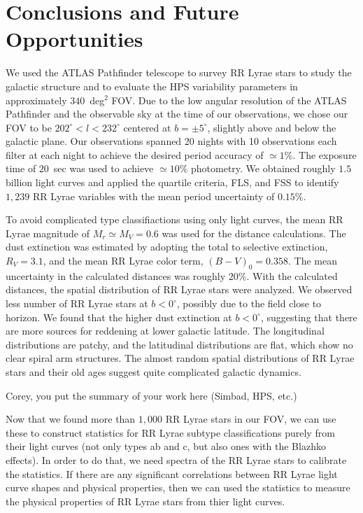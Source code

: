 \documentclass[aps,prb,twocolumn,superscriptaddress]{revtex4-1}
\begin{document}
\section{Conclusions and Future Opportunities}

We used the ATLAS Pathfinder telescope to survey RR Lyrae stars to study the galactic structure and to evaluate the HPS variability parameters in approximately $340$~deg$^2$ FOV. Due to the low angular resolution of the ATLAS Pathfinder and the observable sky at the time of our observations, we chose our FOV to be $202^{\circ} < l <232^{\circ}$ centered at $b=\pm5^{\circ}$, slightly above and below the galactic plane. Our observations spanned 20 nights with 10 observations each filter at each night to achieve the desired period accuracy of $\simeq 1\%$. The exposure time of $20$~sec was used to achieve $\simeq 10\%$ photometry. We obtained roughly $1.5$ billion light curves and applied the quartile criteria, FLS, and FSS to identify $1,239$ RR Lyrae variables with the mean period uncertainty of $0.15\%$.

\indent To avoid complicated type classifiactions using only light curves, the mean RR Lyrae magnitude of $M_r \simeq M_V = 0.6$ was used for the distance calculations. The dust extinction was estimated by adopting the total to selective extinction, $R_V=3.1$, and the mean RR Lyrae color term, $(B-V)_0 = 0.358$. The mean uncertainty in the calculated distances was roughly $20\%$. With the calculated distances, the spatial distribution of RR Lyrae stars were analyzed. We observed less number of RR Lyrae stars at $b<0^{\circ}$, possibly due to the field close to horizon. We found that the higher dust extinction at $b<0^{\circ}$, suggesting that there are more sources for reddening at lower galactic latitude. The longitudinal distributions are patchy, and the latitudinal distributions are flat, which show no clear spiral arm structures. The almost random spatial distributions of RR Lyrae stars and their old ages suggest quite complicated galactic dynamics.

\indent Corey, you put the summary of your work here (Simbad, HPS, etc.) 


\indent Now that we found more than $1,000$ RR Lyrae stars in our FOV, we can use these to construct statistics for RR Lyrae subtype classifications purely from their light curves (not only types ab and c, but also ones with the Blazhko effects). In order to do that, we need spectra of the RR Lyrae stars to calibrate the statistics. If there are any significant correlations between RR Lyrae light curve shapes and physical properties, then we can used the statistics to measure the physical properties of RR Lyrae stars from thier light curves.
\end{document}
